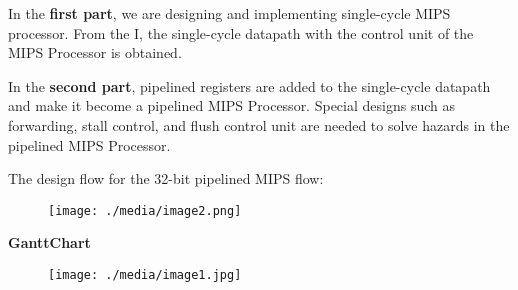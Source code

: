 \documentclass[12pt]{article}
\begin{document}
\vspace{\baselineskip}
{\fontsize{18pt}{21.6pt}\selectfont In the \textbf{first part}, we are designing and implementing single-cycle MIPS processor. From the I, the single-cycle datapath with the control unit of the MIPS Processor is obtained.\par}\par


\vspace{\baselineskip}
{\fontsize{18pt}{21.6pt}\selectfont In the \textbf{second part}, pipelined registers are added to the single-cycle datapath and make it become a pipelined MIPS Processor. Special designs such as forwarding, stall control, and flush control unit are needed to solve hazards in the pipelined MIPS Processor.\par}\par

{\fontsize{18pt}{21.6pt}\selectfont The design flow for the 32-bit pipelined MIPS flow:\par}\par


\vspace{\baselineskip}



\begin{figure}[H]
	\begin{Center}
		\texttt{[image: ./media/image2.png]}
	\end{Center}
\end{figure}



\par

{\fontsize{22pt}{26.4pt}\selectfont \textbf{GanttChart}\par}\par


\vspace{\baselineskip}



\begin{figure}[H]
	\begin{Center}
		\texttt{[image: ./media/image1.jpg]}
	\end{Center}
\end{figure}
\end{document}
